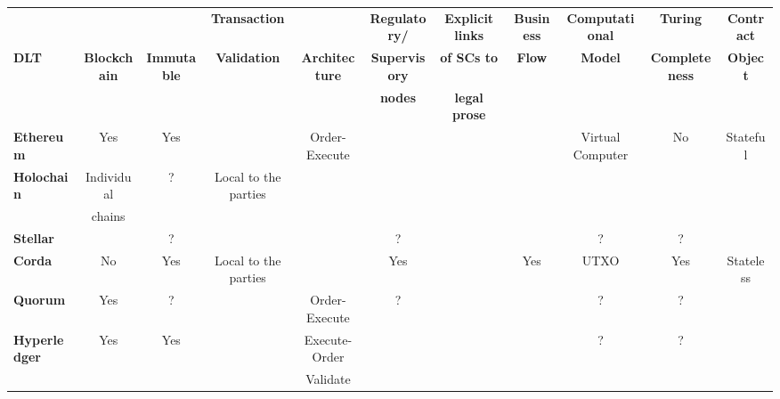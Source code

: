 \begin{table}
\begin{centering}
{\begin{tabular}{| l | c | c | c | c | c | c | c | c | c | c |}
\hline
				& \textbf{}  			& \textbf{}  			& \textbf{Transaction} 	&
				& \textbf{Regulatory/} 	& \textbf{Explicit links}	&\textbf{Business}
				& \textbf{Computational} 	& \textbf{Turing}		&\textbf{Contract} \\
\textbf{DLT}		& \textbf{Blockchain} 	& \textbf{Immutable} 		& \textbf{Validation} 		& \textbf{Architecture} 
				& \textbf{Supervisory} 	& \textbf{of SCs to}		&\textbf{Flow} 
				& \textbf{Model} 		& \textbf{Completeness}	&\textbf{Object} \\
				& \textbf{} 				& \textbf{} 				& \textbf{} 				&
				& \textbf{nodes} 		& \textbf{legal prose}		&\textbf{} 
				& \textbf{} 				& \textbf{}				&\textbf{} \\
\hline
\hline
\textbf{Ethereum}	&Yes			&Yes		&				&Order-Execute	&
				&			&		&Virtual Computer	&No				&Stateful \\
\hline
\textbf{Holochain}	&Individual	&?		&Local to the parties	&				&
				&			& 		&				&				& \\
				&chains		&		&				&				&
				&			& 		&				&				& \\
\hline
\textbf{Stellar}		&			&?		&				&				&?
				&			& 		&?				&?				&\\
\hline
\textbf{Corda} 		&No			&Yes		&Local to the parties	&				&Yes
				&			&Yes		&UTXO			&Yes				&Stateless\\
\hline
\textbf{Quorum} 	&Yes			&?		&				&Order-Execute	&?
				&			& 		&?				&?				&\\
\hline
\textbf{Hyperledger}	&Yes			&Yes		&				&Execute-Order	&
				&			& 		&?				&?				& \\
 				&			&		&				&Validate			&
				&			& 		&				&				& \\
\hline
\end{tabular}}


\vspace{1cm}


\end{centering}
\end{table}
